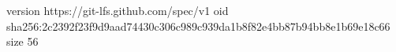 version https://git-lfs.github.com/spec/v1
oid sha256:2c2392f23f9d9aad74430c306c989c939da1b8f82e4bb87b94bb8e1b69e18c66
size 56
